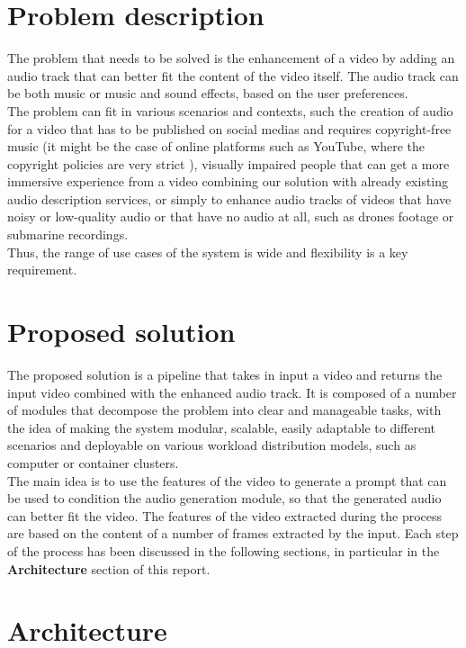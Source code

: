 \documentclass[conference]{IEEEtran}
\begin{document}
\section{Problem description}
The problem that needs to be solved is the enhancement of a video by adding an audio track that can better fit the content of the video itself. The audio track can be both music or music and sound effects, based on the user preferences. \\
The problem can fit in various scenarios and contexts, such the creation of audio for a video that has to be published on social medias and requires copyright-free music (it might be the case of online platforms such as YouTube, where the copyright policies are very strict \cite{ytcopyright}), visually impaired people that can get a more immersive experience from a video combining our solution with already existing audio description services, or simply to enhance audio tracks of videos that have noisy or low-quality audio or that have no audio at all, such as drones footage or submarine recordings. \\
Thus, the range of use cases of the system is wide and flexibility is a key requirement. 

\section{Proposed solution}
The proposed solution is a pipeline that takes in input a video and returns the input video combined with the enhanced audio track. It is composed of a number of modules that decompose the problem into clear and manageable tasks, with the idea of making the system modular, scalable, easily adaptable to different scenarios and deployable on various workload distribution models, such as computer or container clusters. \\
The main idea is to use the features of the video to generate a prompt that can be used to condition the audio generation module, so that the generated audio can better fit the video. The features of the video extracted during the process are based on the content of a number of frames extracted by the input. Each step of the process has been discussed in the following sections, in particular in the \textbf{Architecture} section of this report.

\section{Architecture}
\end{document}
